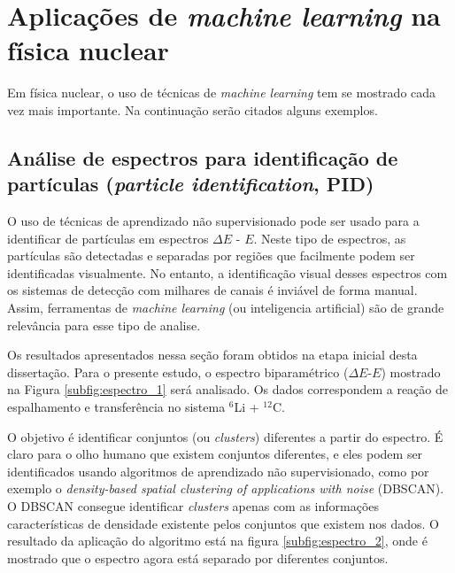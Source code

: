\documentclass[a4paper,12pt,oneside]{book}
\begin{document}
\section{Aplicações de \textit{machine learning} na física nuclear}

\par Em física nuclear, o uso de técnicas de \textit{machine learning} tem se mostrado cada vez mais importante. Na continuação serão citados alguns exemplos.

\subsection{Análise de espectros para identificação de partículas (\textit{particle identification}, PID)}

\par O uso de técnicas de aprendizado não supervisionado pode ser usado para a identificar de partículas em espectros $\Delta E$ - $E$. Neste tipo de espectros, as partículas são detectadas e separadas por regiões que facilmente podem ser identificadas visualmente\cite{DETC_TELE}. No entanto, a identificação visual desses espectros com os sistemas de detecção com milhares de canais é inviável de forma manual. Assim, ferramentas de \textit{machine learning} (ou inteligencia artificial) são de grande relevância para esse tipo de analise.

Os resultados apresentados nessa seção foram obtidos na etapa inicial desta dissertação. Para o presente estudo, o espectro biparamétrico ($\Delta E$-$E$) mostrado na Figura \ref{subfig:espectro_1} será analisado. Os dados correspondem a reação de espalhamento e transferência no sistema $^{6}$Li +  $^{12}$C.



\par O objetivo é identificar conjuntos (ou \textit{clusters}) diferentes a partir do espectro. É claro para o olho humano que existem conjuntos diferentes, e eles podem ser identificados usando algoritmos de aprendizado não supervisionado, como por exemplo o \textit{density-based spatial clustering of applications with noise} (DBSCAN)\cite{dbscan}. O DBSCAN consegue identificar \textit{clusters} apenas com as informações características de densidade existente pelos conjuntos que existem nos dados. O resultado da aplicação do algoritmo está na figura \ref{subfig:espectro_2}, onde é mostrado que o espectro agora está separado por diferentes conjuntos.
\end{document}
